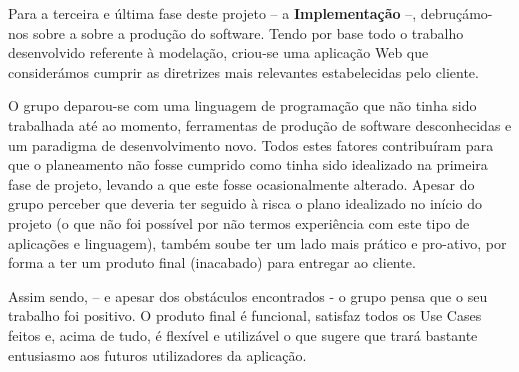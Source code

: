 Para a terceira e última fase deste projeto – a \textbf{Implementação} –, debruçámo-nos sobre a sobre a produção do software. Tendo por base todo o trabalho desenvolvido referente à modelação, criou-se uma aplicação Web que considerámos cumprir as diretrizes mais relevantes estabelecidas pelo cliente.

O grupo deparou-se com uma linguagem de programação que não tinha sido trabalhada até ao momento, ferramentas de produção de software desconhecidas e um paradigma de desenvolvimento novo. Todos estes fatores contribuíram para que o planeamento não fosse cumprido como tinha sido idealizado na primeira fase de projeto, levando a que este fosse ocasionalmente alterado. Apesar do grupo perceber que deveria ter seguido à risca o plano idealizado no início do projeto (o que não foi possível por não termos experiência com este tipo de aplicações e linguagem), também soube ter um lado mais prático e pro-ativo, por forma a ter um produto final (inacabado) para entregar ao cliente.

Assim sendo, – e apesar dos obstáculos encontrados - o grupo pensa que o seu trabalho foi positivo. O produto final é funcional, satisfaz todos os Use Cases feitos e, acima de tudo, é flexível e utilizável o que sugere que trará bastante entusiasmo aos futuros utilizadores da aplicação.
